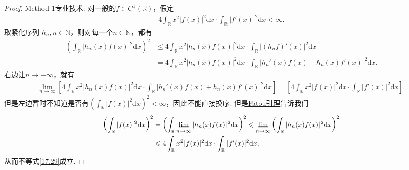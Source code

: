 \documentclass[../../main.tex]{subfiles}%
\begin{document}
\begin{proof}

{\heiti Method 1专业技术:}
对一般的$f\in C^1(\mathbb{R})$，假定
\begin{align*}
4\int_{\mathbb{R}}x^2|f(x)|^2\mathrm{d}x\cdot\int_{\mathbb{R}}|f'(x)|^2\mathrm{d}x < \infty.
\end{align*}
取紧化序列 $h_n, n\in\mathbb{N}$，则对每一个$n\in\mathbb{N}$，都有
\begin{align*}
\left( \int_{\mathbb{R}}|h_n(x)f(x)|^2\mathrm{d}x \right)^2 &\leqslant 4\int_{\mathbb{R}}x^2|h_n(x)f(x)|^2\mathrm{d}x\cdot\int_{\mathbb{R}}|(h_nf)'(x)|^2\mathrm{d}x \\
&= 4\int_{\mathbb{R}}x^2|h_n(x)f(x)|^2\mathrm{d}x\cdot\int_{\mathbb{R}}|h_n'(x)f(x) + h_n(x)f'(x)|^2\mathrm{d}x.
\end{align*}
右边让$n\to +\infty$，就有
\begin{align*}
\lim_{n\to\infty}\left[4\int_{\mathbb{R}}x^2|h_n(x)f(x)|^2\mathrm{d}x\cdot\int_{\mathbb{R}}|h_n'(x)f(x) + h_n(x)f'(x)|^2\mathrm{d}x\right] =\left[4\int_{\mathbb{R}}x^2|f(x)|^2\mathrm{d}x\cdot\int_{\mathbb{R}}|f'(x)|^2\mathrm{d}x\right].
\end{align*}
但是左边暂时不知道是否有$\left(\int_{\mathbb{R}}|f(x)|^2\mathrm{d}x\right)^2 < \infty$，因此不能直接换序. 但是\hyperref[Real-Analysis-theorem:Fatou引理]{Fatou引理}告诉我们
\begin{align*}
\left( \int_{\mathbb{R}}|f(x)|^2\mathrm{d}x \right)^2 &= \left( \int_{\mathbb{R}}\varliminf_{n\to\infty}|h_n(x)f(x)|^2\mathrm{d}x \right)^2 \leqslant \varliminf_{n\to\infty}\left( \int_{\mathbb{R}}|h_n(x)f(x)|^2\mathrm{d}x \right)^2 \\
&\leqslant 4\int_{\mathbb{R}}x^2|f(x)|^2\mathrm{d}x\cdot\int_{\mathbb{R}}|f'(x)|^2\mathrm{d}x,
\end{align*}
从而不等式\eqref{17.29}成立.


\end{proof}
\end{document}
